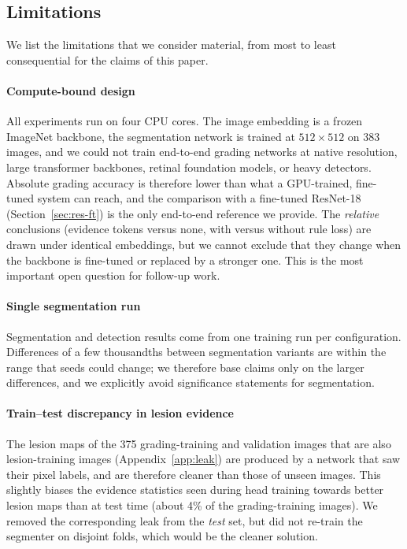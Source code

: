 \subsection{Limitations}
\label{sec:limits}
We list the limitations that we consider material, from most to least consequential for the claims of this paper.

\paragraph{Compute-bound design} All experiments run on four CPU cores. The image embedding is a frozen ImageNet backbone, the segmentation network is trained at $512\times512$ on 383 images, and we could not train end-to-end grading networks at native resolution, large transformer backbones, retinal foundation models, or heavy detectors. Absolute grading accuracy is therefore lower than what a GPU-trained, fine-tuned system can reach, and the comparison with a fine-tuned ResNet-18 (Section~\ref{sec:res-ft}) is the only end-to-end reference we provide. The \emph{relative} conclusions (evidence tokens versus none, with versus without rule loss) are drawn under identical embeddings, but we cannot exclude that they change when the backbone is fine-tuned or replaced by a stronger one. This is the most important open question for follow-up work.

\paragraph{Single segmentation run} Segmentation and detection results come from one training run per configuration. Differences of a few thousandths between segmentation variants are within the range that seeds could change; we therefore base claims only on the larger differences, and we explicitly avoid significance statements for segmentation.

\paragraph{Train--test discrepancy in lesion evidence} The lesion maps of the 375 grading-training and validation images that are also lesion-training images (Appendix~\ref{app:leak}) are produced by a network that saw their pixel labels, and are therefore cleaner than those of unseen images. This slightly biases the evidence statistics seen during head training towards better lesion maps than at test time (about 4\% of the grading-training images). We removed the corresponding leak from the \emph{test} set, but did not re-train the segmenter on disjoint folds, which would be the cleaner solution.


